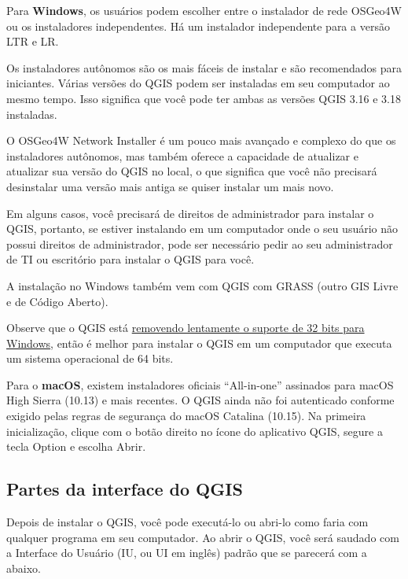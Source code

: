 \documentclass[
]{krantz}
\begin{document}
Para \textbf{Windows}, os usuários podem escolher entre o instalador de rede OSGeo4W ou os instaladores independentes. Há um instalador independente para a versão LTR e LR.

Os instaladores autônomos são os mais fáceis de instalar e são recomendados para iniciantes. Várias versões do QGIS podem ser instaladas em seu computador ao mesmo tempo. Isso significa que você pode ter ambas as versões QGIS 3.16 e 3.18 instaladas.

O OSGeo4W Network Installer é um pouco mais avançado e complexo do que os instaladores autônomos, mas também oferece a capacidade de atualizar e atualizar sua versão do QGIS no local, o que significa que você não precisará desinstalar uma versão mais antiga se quiser instalar um mais novo.

Em alguns casos, você precisará de direitos de administrador para instalar o QGIS, portanto, se estiver instalando em um computador onde o seu usuário não possui direitos de administrador, pode ser necessário pedir ao seu administrador de TI ou escritório para instalar o QGIS para você.

A instalação no Windows também vem com QGIS com GRASS (outro GIS Livre e de Código Aberto).

Observe que o QGIS está \href{https://blog.qgis.org/2020/10/15/phasing-out-32-bit-support-in-qgis/}{removendo lentamente o suporte de 32 bits para Windows}, então é melhor para instalar o QGIS em um computador que executa um sistema operacional de 64 bits.

Para o \textbf{macOS}, existem instaladores oficiais ``All-in-one'' assinados para macOS High Sierra (10.13) e mais recentes. O QGIS ainda não foi autenticado conforme exigido pelas regras de segurança do macOS Catalina (10.15). Na primeira inicialização, clique com o botão direito no ícone do aplicativo QGIS, segure a tecla Option e escolha Abrir.

\hypertarget{partes-da-interface-do-qgis}{%
\subsection{Partes da interface do QGIS}\label{partes-da-interface-do-qgis}}

Depois de instalar o QGIS, você pode executá-lo ou abri-lo como faria com qualquer programa em seu computador. Ao abrir o QGIS, você será saudado com a Interface do Usuário (IU, ou UI em inglês) padrão que se parecerá com a abaixo.
\end{document}
